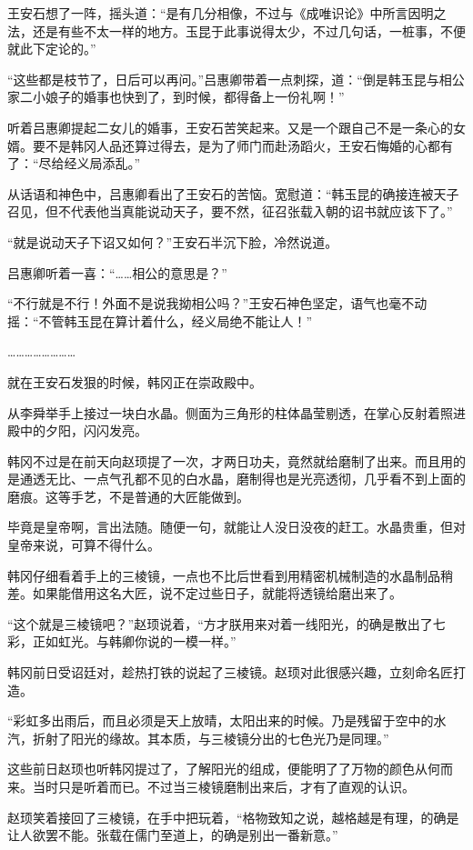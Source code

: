 王安石想了一阵，摇头道：“是有几分相像，不过与《成唯识论》中所言因明之法，还是有些不太一样的地方。玉昆于此事说得太少，不过几句话，一桩事，不便就此下定论的。”

“这些都是枝节了，日后可以再问。”吕惠卿带着一点刺探，道：“倒是韩玉昆与相公家二小娘子的婚事也快到了，到时候，都得备上一份礼啊！”

听着吕惠卿提起二女儿的婚事，王安石苦笑起来。又是一个跟自己不是一条心的女婿。要不是韩冈人品还算过得去，是为了师门而赴汤蹈火，王安石悔婚的心都有了：“尽给经义局添乱。”

从话语和神色中，吕惠卿看出了王安石的苦恼。宽慰道：“韩玉昆的确接连被天子召见，但不代表他当真能说动天子，要不然，征召张载入朝的诏书就应该下了。”

“就是说动天子下诏又如何？”王安石半沉下脸，冷然说道。

吕惠卿听着一喜：“……相公的意思是？”

“不行就是不行！外面不是说我拗相公吗？”王安石神色坚定，语气也毫不动摇：“不管韩玉昆在算计着什么，经义局绝不能让人！”

……………………

就在王安石发狠的时候，韩冈正在崇政殿中。

从李舜举手上接过一块白水晶。侧面为三角形的柱体晶莹剔透，在掌心反射着照进殿中的夕阳，闪闪发亮。

韩冈不过是在前天向赵顼提了一次，才两日功夫，竟然就给磨制了出来。而且用的是通透无比、一点气孔都不见的白水晶，磨制得也是光亮透彻，几乎看不到上面的磨痕。这等手艺，不是普通的大匠能做到。

毕竟是皇帝啊，言出法随。随便一句，就能让人没日没夜的赶工。水晶贵重，但对皇帝来说，可算不得什么。

韩冈仔细看着手上的三棱镜，一点也不比后世看到用精密机械制造的水晶制品稍差。如果能借用这名大匠，说不定过些日子，就能将透镜给磨出来了。

“这个就是三棱镜吧？”赵顼说着，“方才朕用来对着一线阳光，的确是散出了七彩，正如虹光。与韩卿你说的一模一样。”

韩冈前日受诏廷对，趁热打铁的说起了三棱镜。赵顼对此很感兴趣，立刻命名匠打造。

“彩虹多出雨后，而且必须是天上放晴，太阳出来的时候。乃是残留于空中的水汽，折射了阳光的缘故。其本质，与三棱镜分出的七色光乃是同理。”

这些前日赵顼也听韩冈提过了，了解阳光的组成，便能明了了万物的颜色从何而来。当时只是听着而已。不过当三棱镜磨制出来后，才有了直观的认识。

赵顼笑着接回了三棱镜，在手中把玩着，“格物致知之说，越格越是有理，的确是让人欲罢不能。张载在儒门至道上，的确是别出一番新意。”

